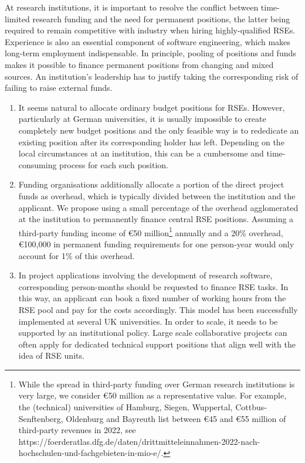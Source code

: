 \documentclass[a4paper]{article}
\begin{document}
At research institutions, it is important to resolve the conflict between time-limited research funding and the need for permanent positions, the latter being required to remain competitive with industry when hiring highly-qualified RSEs.
Experience is also an essential component of software engineering, which makes long-term employment indispensable.
In principle, pooling of positions and funds makes it possible to finance permanent positions from changing and mixed sources.
An institution’s leadership has to justify taking the corresponding risk of failing to raise external funds.
\begin{enumerate}
\item It seems natural to allocate ordinary budget positions for RSEs.
      However, particularly at German universities, it is usually impossible to create completely new budget positions and the only feasible way is to rededicate an existing position after its corresponding holder has left.
      Depending on the local circumstances at an institution, this can be a cumbersome and time-consuming process for each such position.
\item Funding organisations additionally allocate a portion of the direct project funds as overhead, which is typically divided between the institution and the applicant.
      We propose using a small percentage of the overhead agglomerated at the institution to permanently finance central RSE positions.
      Assuming a third-party funding income of €50 million\footnote{While the spread in third-party funding over German research institutions is very large, we consider €50 million as a representative value. For example, the (technical) universities of Hamburg, Siegen, Wuppertal, Cottbus-Senftenberg, Oldenburg and Bayreuth list between €45 and €55 million of third-party revenues in 2022, see https://foerderatlas.dfg.de/daten/drittmitteleinnahmen-2022-nach-hochschulen-und-fachgebieten-in-mio-e/.} annually and a 20\% overhead, €100,000 in permanent funding requirements for one person-year would only account for 1\% of this overhead.
\item In project applications involving the development of research software, corresponding person-months should be requested to finance RSE tasks.
      In this way, an applicant can book a fixed number of working hours from the RSE pool and pay for the costs accordingly.
      This model has been successfully implemented at several UK universities.
      In order to scale, it needs to be supported by an institutional policy.
      Large scale collaborative projects can often apply for dedicated technical support positions that align well with the idea of RSE units.

\end{enumerate}
\end{document}
